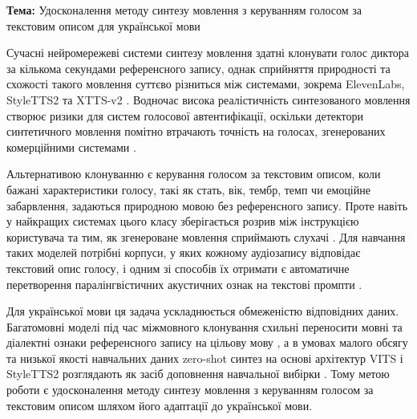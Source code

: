 \textbf{Тема:} Удосконалення методу синтезу мовлення з керуванням голосом за текстовим описом для української мови

Сучасні нейромережеві системи синтезу мовлення здатні клонувати голос диктора за кількома секундами референсного запису, однак сприйняття природності та схожості такого мовлення суттєво різниться між системами, зокрема ElevenLabs, StyleTTS2 та XTTS-v2 . Водночас висока реалістичність синтезованого мовлення створює ризики для систем голосової автентифікації, оскільки детектори синтетичного мовлення помітно втрачають точність на голосах, згенерованих комерційними системами .

Альтернативою клонуванню є керування голосом за текстовим описом, коли бажані характеристики голосу, такі як стать, вік, тембр, темп чи емоційне забарвлення, задаються природною мовою без референсного запису. Проте навіть у найкращих системах цього класу зберігається розрив між інструкцією користувача та тим, як згенероване мовлення сприймають слухачі . Для навчання таких моделей потрібні корпуси, у яких кожному аудіозапису відповідає текстовий опис голосу, і одним зі способів їх отримати є автоматичне перетворення паралінгвістичних акустичних ознак на текстові промпти .

Для української мови ця задача ускладнюється обмеженістю відповідних даних. Багатомовні моделі під час міжмовного клонування схильні переносити мовні та діалектні ознаки референсного запису на цільову мову , а в умовах малого обсягу та низької якості навчальних даних zero-shot синтез на основі архітектур VITS і StyleTTS2 розглядають як засіб доповнення навчальної вибірки . Тому метою роботи є удосконалення методу синтезу мовлення з керуванням голосом за текстовим описом шляхом його адаптації до української мови.
